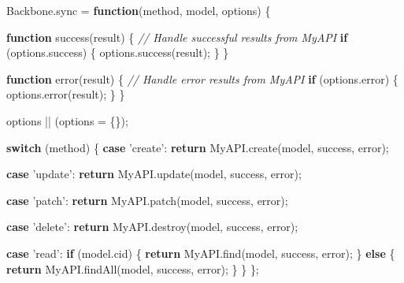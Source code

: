 \documentclass[9pt]{book}
\newenvironment{Shaded}{}{}
\newcommand{\KeywordTok}[1]{\textcolor[rgb]{0.00,0.44,0.13}{\textbf{{#1}}}}
\newcommand{\StringTok}[1]{\textcolor[rgb]{0.25,0.44,0.63}{{#1}}}
\newcommand{\CommentTok}[1]{\textcolor[rgb]{0.38,0.63,0.69}{\textit{{#1}}}}
\newcommand{\OtherTok}[1]{\textcolor[rgb]{0.00,0.44,0.13}{{#1}}}
\newcommand{\FunctionTok}[1]{\textcolor[rgb]{0.02,0.16,0.49}{{#1}}}
\newcommand{\NormalTok}[1]{{#1}}
\begin{document}
\begin{Shaded}
\begin{Highlighting}[]
\OtherTok{Backbone}\NormalTok{.}\FunctionTok{sync} \NormalTok{= }\KeywordTok{function}\NormalTok{(method, model, options) \{}

  \KeywordTok{function} \FunctionTok{success}\NormalTok{(result) \{}
    \CommentTok{// Handle successful results from MyAPI}
    \KeywordTok{if} \NormalTok{(}\OtherTok{options}\NormalTok{.}\FunctionTok{success}\NormalTok{) \{}
      \OtherTok{options}\NormalTok{.}\FunctionTok{success}\NormalTok{(result);}
    \NormalTok{\}}
  \NormalTok{\}}

  \KeywordTok{function} \FunctionTok{error}\NormalTok{(result) \{}
    \CommentTok{// Handle error results from MyAPI}
    \KeywordTok{if} \NormalTok{(}\OtherTok{options}\NormalTok{.}\FunctionTok{error}\NormalTok{) \{}
      \OtherTok{options}\NormalTok{.}\FunctionTok{error}\NormalTok{(result);}
    \NormalTok{\}}
  \NormalTok{\}}

  \NormalTok{options || (options = \{\});}

  \KeywordTok{switch} \NormalTok{(method) \{}
    \KeywordTok{case} \StringTok{'create'}\NormalTok{:}
      \KeywordTok{return} \OtherTok{MyAPI}\NormalTok{.}\FunctionTok{create}\NormalTok{(model, success, error);}

    \KeywordTok{case} \StringTok{'update'}\NormalTok{:}
      \KeywordTok{return} \OtherTok{MyAPI}\NormalTok{.}\FunctionTok{update}\NormalTok{(model, success, error);}

    \KeywordTok{case} \StringTok{'patch'}\NormalTok{:}
      \KeywordTok{return} \OtherTok{MyAPI}\NormalTok{.}\FunctionTok{patch}\NormalTok{(model, success, error);}

    \KeywordTok{case} \StringTok{'delete'}\NormalTok{:}
      \KeywordTok{return} \OtherTok{MyAPI}\NormalTok{.}\FunctionTok{destroy}\NormalTok{(model, success, error);}

    \KeywordTok{case} \StringTok{'read'}\NormalTok{:}
      \KeywordTok{if} \NormalTok{(}\OtherTok{model}\NormalTok{.}\FunctionTok{cid}\NormalTok{) \{}
        \KeywordTok{return} \OtherTok{MyAPI}\NormalTok{.}\FunctionTok{find}\NormalTok{(model, success, error);}
      \NormalTok{\} }\KeywordTok{else} \NormalTok{\{}
        \KeywordTok{return} \OtherTok{MyAPI}\NormalTok{.}\FunctionTok{findAll}\NormalTok{(model, success, error);}
      \NormalTok{\}}
  \NormalTok{\}}
\NormalTok{\};}
\end{Highlighting}
\end{Shaded}
\end{document}
